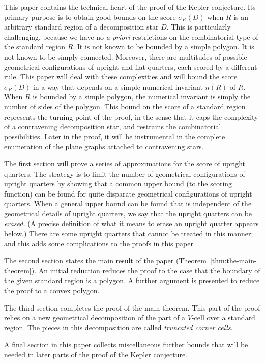 
This paper contains the technical heart of the proof of the Kepler
conjecture.  Its primary purpose is to obtain good bounds on the
score $\sigma_R(D)$ when $R$ is an arbitrary standard region of a
decomposition star $D$.  This is particularly challenging, because
we have no {\it a priori} restrictions on the combinatorial type of
the standard region $R$.  It is not known to be bounded by a simple
polygon.  It is not known to be simply connected. Moreover, there
are multitudes of possible geometrical configurations of upright and
flat quarters, each scored by a different rule.  This paper will
deal with these complexities and will bound the score $\sigma_R(D)$
in a way that depends on a simple numerical invariant $n(R)$ of $R$.
When $R$ is bounded by a simple polygon, the numerical invariant is
simply the number of sides of the polygon. This bound on the score
of a standard region represents the turning point of the proof, in
the sense that it caps the complexity of a contravening
decomposition star, and restrains the combinatorial possibilities.
Later in the proof, it will be instrumental in the complete
enumeration of the plane graphs attached to contravening stars.

The first section will prove a series of approximations for the
score of upright quarters.  The strategy is to limit the number of
geometrical configurations of upright quarters by showing that a
common upper bound (to the scoring function) can be found for quite
disparate geometrical configurations of upright quarters. When a
general upper bound can be found that is independent of the
geometrical details of upright quarters, we say that the upright
quarters can be {\it erased.}  (A precise definition of what it
means to erase an upright quarter appears below.)  There are some
upright quarters that cannot be treated in this manner; and this
adds some complications to the proofs in this paper

The second section states the main result of the paper
(Theorem~\ref{thm:the-main-theorem}).  An initial reduction reduces
the proof to the case that the boundary of the given standard region
is a polygon.  A further argument is presented to reduce the proof
to a convex polygon.

The third section completes the proof of the main theorem.  This
part of the proof relies on a new geometrical decomposition of the
part of a $V$-cell over a standard region. The pieces in this
decomposition are called {\it truncated corner cells}.

A final section in this paper collects miscellaneous further bounds
that will be needed in later parts of the proof of the Kepler
conjecture.
